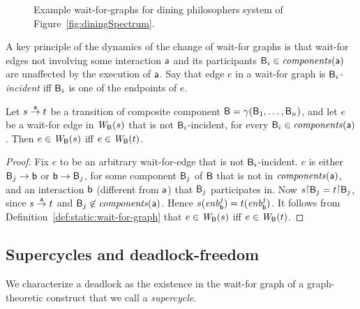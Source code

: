 \begin{figure*}[ht]
  \begin{center}
       \quad \quad
      \caption{Example wait-for-graphs for dining philosophers system of Figure~\ref{fig:diningSpectrum}.}
       \label{fig:wfg}
  \end{center}
\end{figure*}





A key principle of the dynamics of the change of wait-for graphs is that 
wait-for edges not involving some interaction
$\mathsf{a}$ and its participants $\mathsf{B}_i \in \mathit{components}(\mathsf{a})$ are unaffected by the execution
of $\mathsf{a}$.  Say that edge $e$ in a wait-for graph
is \emph{$\mathsf{B}_i$-incident} iff $\mathsf{B}_i$ is one of the endpoints of $e$.


\begin{proposition} \label{prop:wait-for-edge-preservation}
Let $s \stackrel{\mathsf{a}}{\rightarrow} t$ be a transition of composite component $\mathsf{B} =
\gamma(\mathsf{B}_1,\dots,\mathsf{B}_n)$, and let $e$ be a wait-for edge in $\mathit{W}_{\mathsf{B}}({s})$
that is not $\mathsf{B}_i$-incident, for every $\mathsf{B}_i \in \mathit{components}(\mathsf{a})$. Then $e \in
\mathit{W}_{\mathsf{B}}({s})$ iff $e \in \mathit{W}_{\mathsf{B}}({t})$. 
\end{proposition}
%
\begin{proof}
Fix $e$ to be an arbitrary wait-for-edge that is not
$\mathsf{B}_i$-incident. $e$ is either $\mathsf{B}_j \rightarrow \mathsf{b}$ or $\mathsf{b} \rightarrow \mathsf{B}_j$, for some
component $\mathsf{B}_j$ of $\mathsf{B}$ that is not in $\mathit{components}(\mathsf{a})$, and an interaction $\mathsf{b}$
(different from $\mathsf{a}$) that $\mathsf{B}_j$ participates in.
%
Now $s \pj \B_j = t \pj \B_j$, since $s \stackrel{\mathsf{a}}{\rightarrow} t$ and $\mathsf{B}_j \not\in \mathit{components}(\mathsf{a})$. 
Hence $s(\mathit{enb}_{\mathsf{b}}^{j}) = t(\mathit{enb}_{\mathsf{b}}^{j})$. It follows from Definition~\ref{def:static:wait-for-graph} that 
$e \in \mathit{W}_{\mathsf{B}}({s})$ iff $e \in \mathit{W}_{\mathsf{B}}({t})$.
\end{proof}



\subsection{Supercycles and deadlock-freedom}

We characterize a deadlock as the existence in the wait-for graph of a
graph-theoretic construct that we call a {\em supercycle}.

